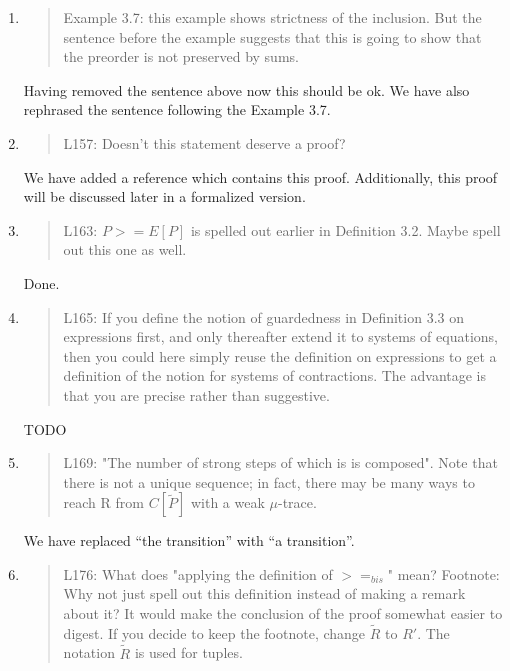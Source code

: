 \begin{enumerate}
\item \begin{quote}
    Example 3.7: this example shows strictness of the inclusion. But
    the sentence before the example suggests that this is going to
    show that the preorder is not preserved by sums.
  \end{quote}

  Having removed the sentence above now this should be ok. We have
  also rephrased the sentence following the Example 3.7.
  
\item \begin{quote}
    L157: Doesn’t this statement deserve a proof?
  \end{quote}
  We have added a reference which contains this proof. Additionally,
  this proof will be discussed later in a formalized version.
  
\item \begin{quote}
    L163: $P >= E[P]$ is spelled out earlier in Definition 3.2. Maybe spell out this one as well.
  \end{quote}

  Done.

\item \begin{quote}
    L165: If you define the notion of guardedness in Definition 3.3 on
    expressions first, and only thereafter extend it to systems of
    equations, then you could here simply reuse the definition on
    expressions to get a definition of the notion for systems of
    contractions. The advantage is that you are precise rather than
    suggestive.
  \end{quote}

  TODO

\item \begin{quote}
    L169: "The number of strong steps of which is is composed". Note
    that there is not a unique sequence; in fact, there may be many
    ways to reach R from $C[\tilde{P}]$ with a weak $\mu$-trace.
  \end{quote}

  We have replaced ``the transition'' with ``a transition''.

\item \begin{quote}
    L176: What does "applying the definition of $>=_{bis}$" mean?
    Footnote: Why not just spell out this definition instead of making a remark about it?  It would make the conclusion of the proof somewhat easier to digest. If you decide to keep the footnote, change $\tilde{R}$ to $R'$. The notation $\tilde{R}$ is used for tuples.
  \end{quote}


\end{enumerate}
